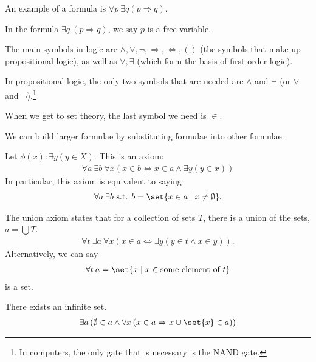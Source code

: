 \documentclass[10pt]{mypackage}
\begin{document}
\begin{example}
  An example of a formula is $\forall p\:\exists q(p\Rightarrow q)$.\newline

  In the formula $\exists q\:\left(p\Rightarrow q\right)$, we say $p$ is a free variable.\newline

  The main symbols in logic are $\wedge,\vee,\lnot,\Rightarrow,\Leftrightarrow,()$ (the symbols that make up propositional logic), as well as $\forall,\exists$ (which form the basis of first-order logic).\newline

  In propositional logic, the only two symbols that are needed are $\wedge$ and $\lnot$ (or $\vee$ and $\lnot$).\footnote{In computers, the only gate that is necessary is the NAND gate.}\newline

  When we get to set theory, the last symbol we need is $\in$.\newline

  We can build larger formulae by substituting formulae into other formulae.
\end{example}
\begin{example}
Let $\phi(x): \exists y\left(y\in X\right)$. This is an axiom:
\begin{align*}
  \forall a\:\exists b\:\forall x\left(x\in b \Leftrightarrow x\in a\wedge \exists y\left(y\in x\right)\right)
\end{align*}
In particular, this axiom is equivalent to saying
\begin{align*}
  \forall a\:\exists b\text{ s.t. }b = \set{x\in a\mid x\neq \emptyset}.
\end{align*}
\end{example}
\begin{axiom}[Union]
  The union axiom states that for a collection of sets $T$, there is a union of the sets, $a = \bigcup T$.
  \begin{align*}
    \forall t\:\exists a\:\forall x\left(x\in a \Leftrightarrow \exists y\left(y\in t\wedge x\in y\right)\right).
  \end{align*}
  Alternatively, we can say
  \begin{align*}
    \forall t\:a = \set{x\mid x\in \text{some element of }t}
  \end{align*}
  is a set.
\end{axiom}
\begin{axiom}[Infinity]
  There exists an infinite set.
  \begin{align*}
    \exists a\left(\emptyset\in a\wedge \forall x\left(x\in a \Rightarrow x \cup \set{x}\in a\right)\right)
  \end{align*}
\end{axiom}
\end{document}
